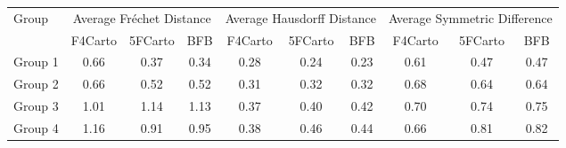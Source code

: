 
\begin{tabular}{lccc|ccc|ccc}
\toprule
\multirow{2}{*}{Group} & \multicolumn{3}{c}{Average Fréchet Distance} & \multicolumn{3}{c}{Average Hausdorff Distance} & \multicolumn{3}{c}{Average Symmetric Difference} \\
\cmidrule(lr){2-10}
                   & F4Carto & 5FCarto & BFB & F4Carto & 5FCarto & BFB & F4Carto & 5FCarto & BFB \\
\midrule

Group 1 & 0.66 & 0.37 & 0.34 & 0.28 & 0.24 & 0.23 & 0.61 & 0.47 & 0.47 \\
Group 2 & 0.66 & 0.52 & 0.52 & 0.31 & 0.32 & 0.32 & 0.68 & 0.64 & 0.64 \\
Group 3 & 1.01 & 1.14 & 1.13 & 0.37 & 0.40 & 0.42 & 0.70 & 0.74 & 0.75 \\
Group 4 & 1.16 & 0.91 & 0.95 & 0.38 & 0.46 & 0.44 & 0.66 & 0.81 & 0.82 \\
\bottomrule
\end{tabular}
